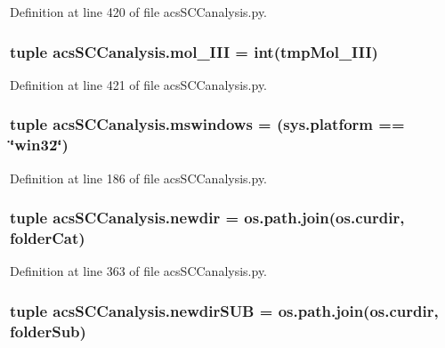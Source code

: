 Definition at line 420 of file acs\-S\-C\-Canalysis.\-py.

\hypertarget{a00128_a20047e8516f386a7e98ffa0efec09471}{
\subsubsection[{mol\-\_\-\-I\-I\-I}]{\setlength{\rightskip}{0pt plus 5cm}tuple acs\-S\-C\-Canalysis.\-mol\-\_\-\-I\-I\-I = int(tmp\-Mol\-\_\-\-I\-I\-I)}}\label{a00128_a20047e8516f386a7e98ffa0efec09471}


Definition at line 421 of file acs\-S\-C\-Canalysis.\-py.

\hypertarget{a00128_a2abf09620dd1dd990036c67c626b3dee}{
\subsubsection[{mswindows}]{\setlength{\rightskip}{0pt plus 5cm}tuple acs\-S\-C\-Canalysis.\-mswindows = (sys.\-platform == \char`\"{}win32\char`\"{})}}\label{a00128_a2abf09620dd1dd990036c67c626b3dee}


Definition at line 186 of file acs\-S\-C\-Canalysis.\-py.

\hypertarget{a00128_a440179ca1c764cabcf9181985ae5dfb8}{
\subsubsection[{newdir}]{\setlength{\rightskip}{0pt plus 5cm}tuple acs\-S\-C\-Canalysis.\-newdir = os.\-path.\-join(os.\-curdir, {\bf folder\-Cat})}}\label{a00128_a440179ca1c764cabcf9181985ae5dfb8}


Definition at line 363 of file acs\-S\-C\-Canalysis.\-py.

\hypertarget{a00128_adb3b62d0896774bc87adfee19d047aa8}{
\subsubsection[{newdir\-S\-U\-B}]{\setlength{\rightskip}{0pt plus 5cm}tuple acs\-S\-C\-Canalysis.\-newdir\-S\-U\-B = os.\-path.\-join(os.\-curdir, {\bf folder\-Sub})}}\label{a00128_adb3b62d0896774bc87adfee19d047aa8}


